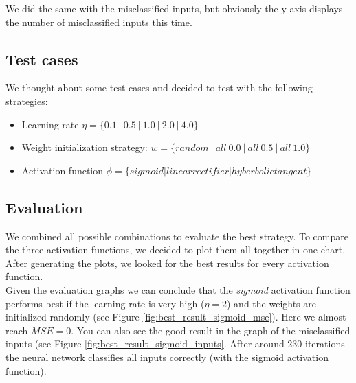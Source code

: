 \documentclass{article}
\begin{document}
We did the same with the misclassified inputs, but obviously the y-axis displays the number of misclassified inputs this time.

\subsection{Test cases}

We thought about some test cases and decided to test with the following strategies:

\begin{itemize}
\item{Learning rate $\eta = \{0.1\ |\ 0.5\ |\ 1.0\ |\ 2.0\ |\ 4.0 \}$}
\item{Weight initialization strategy: $w = \{ random\ |\ all\ 0.0\ |\ all\ 0.5\ |\ all\ 1.0\}$}
\item{Activation function $\phi = \{sigmoid | linear rectifier | hyberbolic tangent\}$}
\end{itemize}



\subsection{Evaluation}
We combined all possible combinations to evaluate the best strategy.
To compare the three activation functions, we decided to plot them all together in one chart.
After generating the plots, we looked for the best results for every activation function.
\\

Given the evaluation graphs we can conclude that the \emph{sigmoid} activation function performs best if the learning rate is very high ($\eta = 2$) and the weights are initialized randomly (see Figure \ref{fig:best_result_sigmoid_mse}).  Here we almost reach $MSE = 0$. You can also see the good result in the graph of the misclassified inputs (see Figure \ref{fig:best_result_sigmoid_inputs}. After around 230 iterations the neural network classifies all inputs correctly (with the sigmoid activation function).
\end{document}
